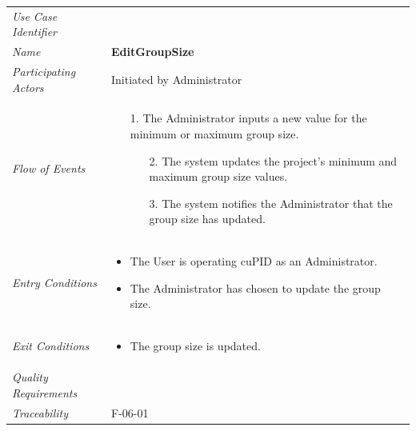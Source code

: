 \documentclass[12pt,letterpaper]{article}
\begin{document}
\begin{center}
	\begin{tabu} to 
		\toprule
		Use Case Identifier & \editgroupsize{} \\
		Name & {\bf EditGroupSize} \\
		Participating Actors & Initiated by Administrator \\
		Flow of Events & 
		\begin{minipage}[t]{\linewidth}
		    \begin{enumerate}
			    \item[1.] The Administrator inputs a new value for the minimum or maximum group size.
			    \begin{enumerate}
			        \item[2.] The system updates the project's minimum and maximum group size values.
			        \item[3.] The system notifies the Administrator that the group size has updated.
			    \end{enumerate}
			\end{enumerate}
		\end{minipage} \\

		Entry Conditions &
		\begin{minipage}[t]{\linewidth}
			\begin{itemize}
			    \item The User is operating cuPID as an Administrator.
			    \item The Administrator has chosen to update the group size.
	        \end{itemize}
		\end{minipage} \\

		Exit Conditions &
		\begin{minipage}[t]{\linewidth}
			\begin{itemize}
			    \item The group size is updated.
	        \end{itemize}
		\end{minipage} \\

		Quality Requirements & \\

		Traceability & F-06-01 \\
		\toprule
	\end{tabu}
\end{center}
\end{document}

